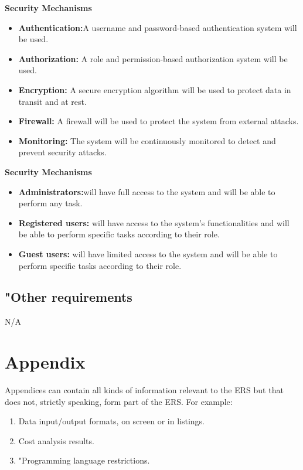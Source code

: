 \documentclass[12pt,a4paper, twosite]{article}
\begin{document}
\textbf{Security Mechanisms}    
\begin{itemize}
    \item \textbf{Authentication:}A username and password-based authentication system will be used.
    \item \textbf{Authorization:} A role and permission-based authorization system will be used.
    \item \textbf{Encryption:} A secure encryption algorithm will be used to protect data in transit and at rest.
    \item \textbf{Firewall:} A firewall will be used to protect the system from external attacks.
    \item \textbf{Monitoring:} The system will be continuously monitored to detect and prevent security attacks.
\end{itemize}

\textbf{Security Mechanisms}    
\begin{itemize}
    \item \textbf{Administrators:}will have full access to the system and will be able to perform any task.
    \item \textbf{Registered users: } will have access to the system's functionalities and will be able to perform specific tasks according to their role.
    \item \textbf{Guest users:} will have limited access to the system and will be able to perform specific tasks according to their role.
      
\end{itemize}

\subsection{"Other requirements}
\label{sec:org31d2978}

N/A

\newpage


\section{Appendix}
\label{sec:org75cea03}

Appendices can contain all kinds of information relevant to the ERS but that does not, strictly speaking, form part of the ERS. For example:

\begin{enumerate}
\item Data input/output formats, on screen or in listings.
\item Cost analysis results.
\item "Programming language restrictions.
\end{enumerate}
\end{document}
